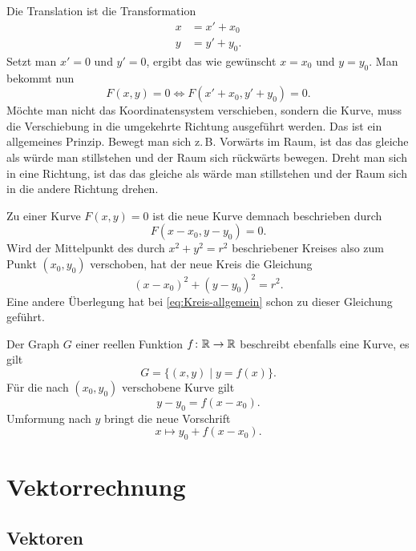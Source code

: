 Die Translation ist die Transformation
\begin{equation}
\begin{split}
x &= x'+x_0\\
y &= y'+y_0.
\end{split}
\end{equation}
Setzt man $x'=0$ und $y'=0$, ergibt das wie gewünscht
$x=x_0$ und $y=y_0$. Man bekommt nun
\begin{equation}
F(x,y)=0 \iff F(x'+x_0, y'+y_0)=0.
\end{equation}
Möchte man nicht das Koordinatensystem verschieben, sondern
die Kurve, muss die Verschiebung in die umgekehrte Richtung
ausgeführt werden. Das ist ein allgemeines Prinzip. Bewegt man
sich z.\,B. Vorwärts im Raum, ist das das gleiche als würde man
stillstehen und der Raum sich rückwärts bewegen. Dreht man sich
in eine Richtung, ist das das gleiche als wärde man stillstehen
und der Raum sich in die andere Richtung drehen.

Zu einer Kurve $F(x,y)=0$ ist die neue Kurve demnach beschrieben
durch%
\begin{equation}
F(x-x_0, y-y_0) = 0.
\end{equation}
Wird der Mittelpunkt des durch $x^2+y^2=r^2$ beschriebener Kreises
also zum Punkt $(x_0,y_0)$ verschoben, hat der neue Kreis die
Gleichung
\begin{equation}
(x-x_0)^2 + (y-y_0)^2 = r^2.
\end{equation}
Eine andere Überlegung hat bei \eqref{eq:Kreis-allgemein}
schon zu dieser Gleichung geführt.

Der Graph $G$ einer reellen Funktion $f\colon\mathbb R\to\mathbb R$ beschreibt
ebenfalls eine Kurve, es gilt
\begin{equation}
G = \{(x,y)\mid y=f(x)\}.
\end{equation}
Für die nach $(x_0,y_0)$ verschobene Kurve gilt
\begin{equation}
y-y_0 = f(x-x_0).
\end{equation}
Umformung nach $y$ bringt die neue Vorschrift
\begin{equation}
x\mapsto y_0+f(x-x_0).
\end{equation}

\section{Vektorrechnung}

\subsection{Vektoren}

